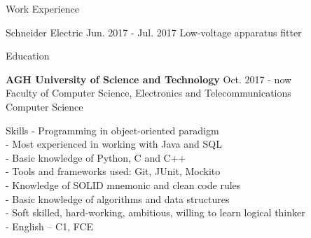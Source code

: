 \documentclass{resume} %
\begin{document}



\begin{rSection}
{Work Experience}
\begin{rSubsection}
{Schneider Electric}
{Jun. 2017 - Jul. 2017}
{Low-voltage apparatus fitter}

\end{rSubsection}

\end{rSection}


\begin{rSection}{Education}

{\bf AGH University of Science and Technology} \hfill {Oct. 2017 - now} 
\\ Faculty of Computer Science, Electronics and Telecommunications
\\ Computer Science

\end{rSection}


\begin{rSection}{Skills}
- Programming in object-oriented paradigm
\\- Most experienced in working with Java and SQL
\\- Basic knowledge of Python, C and C++
\\- Tools and frameworks used: Git, JUnit, Mockito
\\- Knowledge of SOLID mnemonic and clean code rules
\\- Basic knowledge of algorithms and data structures
\\- Soft skilled, hard-working, ambitious, willing to learn logical thinker
\\- English – C1, FCE
\end{rSection}
\end{document}
